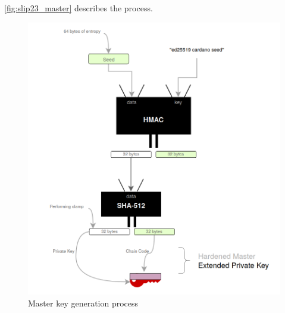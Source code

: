 \autoref{fig:slip23_master} describes the process.

\begin{figure}[ht!]
    \centering
    \includegraphics[width=1\textwidth]{images/slip23_master.png}
    \caption[Master key generation process]{Master key generation process}
    \label{fig:slip23_master}
\end{figure}

